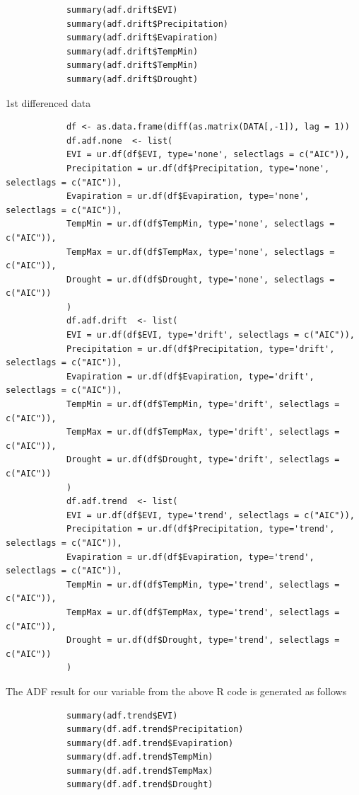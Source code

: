 \documentclass[12pt,a4paper]{book}
\begin{document}
			
				\begin{shaded}
				\begin{verbatim}
			summary(adf.drift$EVI)
			summary(adf.drift$Precipitation)
			summary(adf.drift$Evapiration)
			summary(adf.drift$TempMin)
			summary(adf.drift$TempMin)
			summary(adf.drift$Drought)
				\end{verbatim}
		\end{shaded}			
			1st differenced data
				\begin{shaded}
				\begin{verbatim}
			df <- as.data.frame(diff(as.matrix(DATA[,-1]), lag = 1))
			df.adf.none  <- list(
			EVI = ur.df(df$EVI, type='none', selectlags = c("AIC")),
			Precipitation = ur.df(df$Precipitation, type='none', selectlags = c("AIC")),
			Evapiration = ur.df(df$Evapiration, type='none', selectlags = c("AIC")),
			TempMin = ur.df(df$TempMin, type='none', selectlags = c("AIC")),
			TempMax = ur.df(df$TempMax, type='none', selectlags = c("AIC")),
			Drought = ur.df(df$Drought, type='none', selectlags = c("AIC"))
			)
			df.adf.drift  <- list(
			EVI = ur.df(df$EVI, type='drift', selectlags = c("AIC")),
			Precipitation = ur.df(df$Precipitation, type='drift', selectlags = c("AIC")),
			Evapiration = ur.df(df$Evapiration, type='drift', selectlags = c("AIC")),
			TempMin = ur.df(df$TempMin, type='drift', selectlags = c("AIC")),
			TempMax = ur.df(df$TempMax, type='drift', selectlags = c("AIC")),
			Drought = ur.df(df$Drought, type='drift', selectlags = c("AIC"))
			)
			df.adf.trend  <- list(
			EVI = ur.df(df$EVI, type='trend', selectlags = c("AIC")),
			Precipitation = ur.df(df$Precipitation, type='trend', selectlags = c("AIC")),
			Evapiration = ur.df(df$Evapiration, type='trend', selectlags = c("AIC")),
			TempMin = ur.df(df$TempMin, type='trend', selectlags = c("AIC")),
			TempMax = ur.df(df$TempMax, type='trend', selectlags = c("AIC")),
			Drought = ur.df(df$Drought, type='trend', selectlags = c("AIC"))
			)
				\end{verbatim}
		\end{shaded}
	
			The ADF result for our variable from the above R code is generated as follows
			
				\begin{shaded}
				\begin{verbatim}
			summary(adf.trend$EVI)
			summary(df.adf.trend$Precipitation)
			summary(df.adf.trend$Evapiration)
			summary(df.adf.trend$TempMin)
			summary(df.adf.trend$TempMax)
			summary(df.adf.trend$Drought)
			
				\end{verbatim}
		\end{shaded}
	
\end{document}
